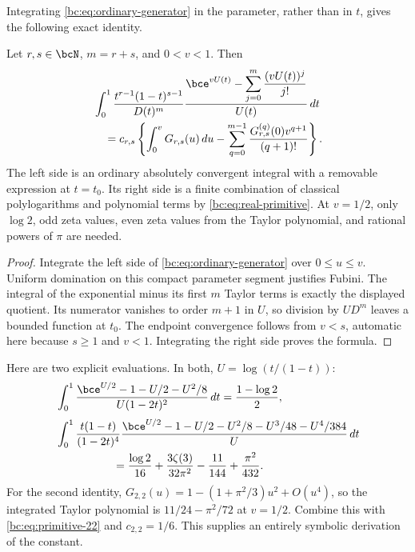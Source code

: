 Integrating \eqref{bc:eq:ordinary-generator} in the parameter, rather than
in $t$, gives the following exact identity.

\begin{theorem}
\label{bc:thm:inverse-log}
Let $r,s\in\bcN$, $m=r+s$, and $0<v<1$. Then
\begin{align}
 &\int_0^1\frac{t^{r-1}(1-t)^{s-1}}{D(t)^m}
 \frac{\displaystyle\bce^{vU(t)}
              -\sum_{j=0}^{m}\frac{(vU(t))^j}{j!}}{U(t)}\,dt\notag\\
 &\quad=c_{r,s}\left\{\int_0^vG_{r,s}(u)\,du
       -\sum_{q=0}^{m-1}
          \frac{G_{r,s}^{(q)}(0)v^{q+1}}{(q+1)!}\right\}.
 \label{bc:eq:inverse-log}
\end{align}
The left side is an ordinary absolutely convergent integral with a
removable expression at $t=t_0$. Its right side is a finite combination
of classical polylogarithms and polynomial terms by
\eqref{bc:eq:real-primitive}. At $v=1/2$, only $\log2$, odd zeta values,
even zeta values from the Taylor polynomial, and rational powers of
$\pi$ are needed.
\end{theorem}
\begin{proof}
Integrate the left side of \eqref{bc:eq:ordinary-generator} over
$0\le u\le v$. Uniform domination on this compact parameter segment
justifies Fubini. The integral of the exponential minus its first $m$
Taylor terms is exactly the displayed quotient. Its numerator vanishes
to order $m+1$ in $U$, so division by $U D^m$ leaves a bounded function
at $t_0$. The endpoint convergence follows from $v<s$, automatic here
because $s\ge1$ and $v<1$. Integrating the right side proves the formula.
\end{proof}

Here are two explicit evaluations. In both, $U=\log(t/(1-t))$:
\begin{align}
 &\int_0^1\frac{\bce^{U/2}-1-U/2-U^2/8}{U(1-2t)^2}\,dt
             =\frac{1-\log2}{2},
 \label{bc:eq:inverse-11}\\[3pt]
 &\int_0^1\frac{t(1-t)}{(1-2t)^4}
  \frac{\bce^{U/2}-1-U/2-U^2/8-U^3/48-U^4/384}{U}\,dt\notag\\
 &\hspace{18mm}=
  \frac{\log2}{16}+\frac{3\zeta(3)}{32\pi^2}
                   -\frac{11}{144}+\frac{\pi^2}{432}.
 \label{bc:eq:inverse-22}
\end{align}
For the second identity,
$G_{2,2}(u)=1-(1+\pi^2/3)u^2+O(u^4)$, so the integrated Taylor
polynomial is $11/24-\pi^2/72$ at $v=1/2$. Combine this with
\eqref{bc:eq:primitive-22} and $c_{2,2}=1/6$. This supplies an entirely
symbolic derivation of the constant.

